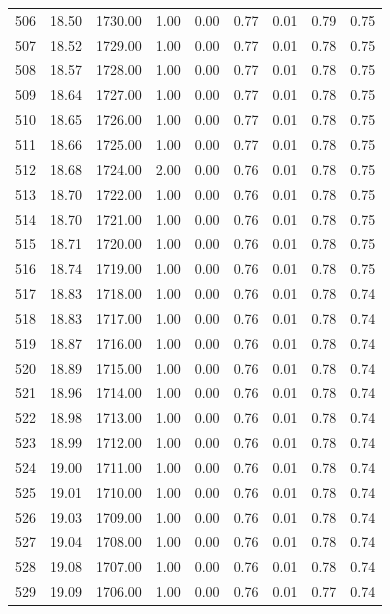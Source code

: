 \documentclass{article}\usepackage[]{graphicx}\usepackage[]{color}
\begin{document}
\begin{longtable}{rrrrrrrrr}
  506 & 18.50 & 1730.00 & 1.00 & 0.00 & 0.77 & 0.01 & 0.79 & 0.75 \\ 
  507 & 18.52 & 1729.00 & 1.00 & 0.00 & 0.77 & 0.01 & 0.78 & 0.75 \\ 
  508 & 18.57 & 1728.00 & 1.00 & 0.00 & 0.77 & 0.01 & 0.78 & 0.75 \\ 
  509 & 18.64 & 1727.00 & 1.00 & 0.00 & 0.77 & 0.01 & 0.78 & 0.75 \\ 
  510 & 18.65 & 1726.00 & 1.00 & 0.00 & 0.77 & 0.01 & 0.78 & 0.75 \\ 
  511 & 18.66 & 1725.00 & 1.00 & 0.00 & 0.77 & 0.01 & 0.78 & 0.75 \\ 
  512 & 18.68 & 1724.00 & 2.00 & 0.00 & 0.76 & 0.01 & 0.78 & 0.75 \\ 
  513 & 18.70 & 1722.00 & 1.00 & 0.00 & 0.76 & 0.01 & 0.78 & 0.75 \\ 
  514 & 18.70 & 1721.00 & 1.00 & 0.00 & 0.76 & 0.01 & 0.78 & 0.75 \\ 
  515 & 18.71 & 1720.00 & 1.00 & 0.00 & 0.76 & 0.01 & 0.78 & 0.75 \\ 
  516 & 18.74 & 1719.00 & 1.00 & 0.00 & 0.76 & 0.01 & 0.78 & 0.75 \\ 
  517 & 18.83 & 1718.00 & 1.00 & 0.00 & 0.76 & 0.01 & 0.78 & 0.74 \\ 
  518 & 18.83 & 1717.00 & 1.00 & 0.00 & 0.76 & 0.01 & 0.78 & 0.74 \\ 
  519 & 18.87 & 1716.00 & 1.00 & 0.00 & 0.76 & 0.01 & 0.78 & 0.74 \\ 
  520 & 18.89 & 1715.00 & 1.00 & 0.00 & 0.76 & 0.01 & 0.78 & 0.74 \\ 
  521 & 18.96 & 1714.00 & 1.00 & 0.00 & 0.76 & 0.01 & 0.78 & 0.74 \\ 
  522 & 18.98 & 1713.00 & 1.00 & 0.00 & 0.76 & 0.01 & 0.78 & 0.74 \\ 
  523 & 18.99 & 1712.00 & 1.00 & 0.00 & 0.76 & 0.01 & 0.78 & 0.74 \\ 
  524 & 19.00 & 1711.00 & 1.00 & 0.00 & 0.76 & 0.01 & 0.78 & 0.74 \\ 
  525 & 19.01 & 1710.00 & 1.00 & 0.00 & 0.76 & 0.01 & 0.78 & 0.74 \\ 
  526 & 19.03 & 1709.00 & 1.00 & 0.00 & 0.76 & 0.01 & 0.78 & 0.74 \\ 
  527 & 19.04 & 1708.00 & 1.00 & 0.00 & 0.76 & 0.01 & 0.78 & 0.74 \\ 
  528 & 19.08 & 1707.00 & 1.00 & 0.00 & 0.76 & 0.01 & 0.78 & 0.74 \\ 
  529 & 19.09 & 1706.00 & 1.00 & 0.00 & 0.76 & 0.01 & 0.77 & 0.74 \\ 

\end{longtable}
\end{document}
